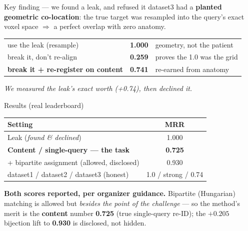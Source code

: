 \documentclass[aspectratio=169,11pt]{beamer}
\begin{document}
\begin{frame}{Key finding — we found a leak, and refused it}
  dataset3 had a \textbf{planted geometric co-location}: the true target was resampled into the
  query's exact voxel space $\Rightarrow$ a perfect overlap with \alert{zero anatomy}.
  \vfill
  \begin{center}\large
  \begin{tabular}{lcl}
    \toprule
    use the leak (resample) & \textbf{1.000} & \color{bad}geometry, not the patient\\
    break it, don't re-align & \textbf{0.259} & \color{bad}proves the 1.0 was the grid\\
    \textbf{break it + re-register on content} & \textbf{0.741} & \color{ok}re-earned from anatomy\\
    \bottomrule
  \end{tabular}
  \end{center}
  \vfill
  \begin{center}\itshape We measured the leak's exact worth (+0.74), then declined it.\end{center}
\end{frame}

\begin{frame}{Results (real leaderboard)}
  \begin{center}\large
  \begin{tabular}{lc}
    \toprule
    \textbf{Setting} & \textbf{MRR} \\
    \midrule
    Leak (\emph{found \& declined}) & 1.000 \\
    \textbf{\color{ok}Content / single-query — the task} & \textbf{\color{ok}0.725} \\
    \quad + bipartite assignment (allowed, disclosed) & 0.930 \\
    \midrule
    dataset1 / dataset2 / dataset3 (honest) & 1.0 / strong / 0.74 \\
    \bottomrule
  \end{tabular}
  \end{center}
  \vfill
  \footnotesize
  \textbf{Both scores reported, per organizer guidance.} Bipartite (Hungarian) matching is allowed
  but \emph{besides the point of the challenge} — so the method's merit is the \textbf{content}
  number \textbf{0.725} (true single-query re-ID); the $+0.205$ bijection lift to \textbf{0.930} is
  disclosed, not hidden.
\end{frame}
\end{document}
